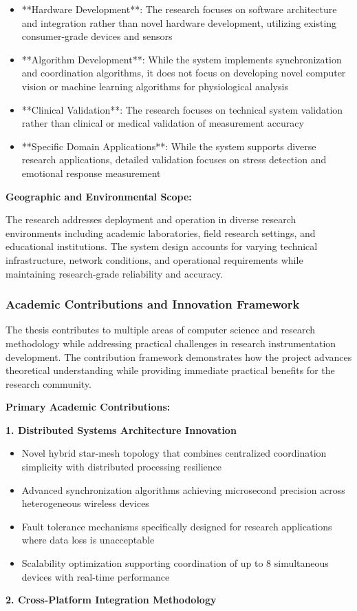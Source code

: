 \documentclass[11pt,a4paper]{article}
\begin{document}
\begin{itemize}
\item **Hardware Development**: The research focuses on software architecture and integration rather than novel hardware
  development, utilizing existing consumer-grade devices and sensors
\item **Algorithm Development**: While the system implements synchronization and coordination algorithms, it
  does not focus on developing novel computer vision or machine learning algorithms
  for physiological analysis
\item **Clinical Validation**: The research focuses on technical system validation rather than clinical or medical
  validation of measurement accuracy
\item **Specific Domain Applications**: While the system supports diverse research applications, detailed validation focuses
  on stress detection and emotional response measurement

\end{itemize}
\textbf{Geographic and Environmental Scope:}

The research addresses deployment and operation in diverse research environments
including academic laboratories, field
research settings, and educational institutions.  The system design accounts for
varying technical infrastructure,
network conditions, and operational requirements while maintaining research-grade
reliability and accuracy.

\subsubsection{Academic Contributions and Innovation Framework}

The thesis contributes to multiple areas of computer science and research methodology
while addressing practical
challenges in research instrumentation development.  The contribution framework
demonstrates how the project advances
theoretical understanding while providing immediate practical benefits for the
research community.

\textbf{Primary Academic Contributions:}

\textbf{1. Distributed Systems Architecture Innovation}

\begin{itemize}
\item Novel hybrid star-mesh topology that combines centralized coordination simplicity with distributed processing
  resilience
\item Advanced synchronization algorithms achieving microsecond precision across heterogeneous wireless devices
\item Fault tolerance mechanisms specifically designed for research applications where data loss is unacceptable
\item Scalability optimization supporting coordination of up to 8 simultaneous devices with real-time performance

\end{itemize}
\textbf{2. Cross-Platform Integration Methodology}
\end{document}
